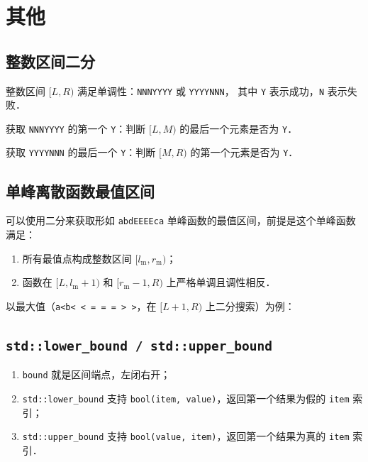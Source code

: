 \section{其他}

\subsection{整数区间二分}

整数区间 $[L, R)$ 满足单调性：{\tt NNNYYYY} 或 {\tt YYYYNNN}，
其中 {\tt Y} 表示成功，{\tt N} 表示失败．

获取 {\tt NNNYYYY} 的第一个 {\tt Y}：判断 $[L, M)$ 的最后一个元素是否为 {\tt Y}．



获取 {\tt YYYYNNN} 的最后一个 {\tt Y}：判断 $[M, R)$ 的第一个元素是否为 {\tt Y}．



\subsection{单峰离散函数最值区间}

可以使用二分来获取形如 {\tt abdEEEEca} 单峰函数的最值区间，前提是这个单峰函数满足：

\begin{enumerate}[noitemsep]
    \item 所有最值点构成整数区间 $[l_{\mathrm m}, r_{\mathrm m})$；
    \item 函数在 $[L, l_{\mathrm m} + 1)$ 和 $[r_{\mathrm m} - 1, R)$ 上严格单调且调性相反．
\end{enumerate}

以最大值（{\tt a<b< < = = = > >}，在 $[L + 1, R)$ 上二分搜索）为例：



\subsection{{\tt std::lower\_bound / std::upper\_bound}}

\begin{enumerate}[noitemsep]
    \item {\tt bound} 就是区间端点，左闭右开；
    \item {\tt std::lower\_bound} 支持 {\tt bool(item, value)}，返回第一个结果为假的 {\tt item} 索引；
    \item {\tt std::upper\_bound} 支持 {\tt bool(value, item)}，返回第一个结果为真的 {\tt item} 索引．
\end{enumerate}

